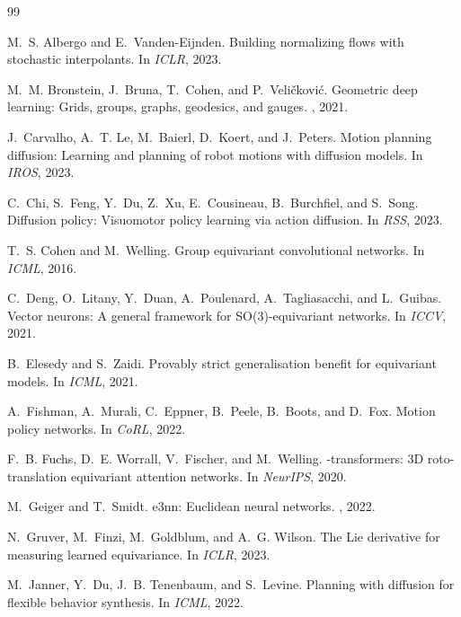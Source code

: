 \documentclass[10pt,twocolumn,letterpaper]{article}
\theoremstyle{plain}
\begin{document}
\small

\begin{thebibliography}{99}

M.~S. Albergo and E.~Vanden-Eijnden.
\newblock Building normalizing flows with stochastic interpolants.
\newblock In {\em ICLR}, 2023.

M.~M. Bronstein, J.~Bruna, T.~Cohen, and P.~Veli\v{c}kovi\'{c}.
\newblock Geometric deep learning: Grids, groups, graphs, geodesics, and gauges.
, 2021.

J.~Carvalho, A.~T. Le, M.~Baierl, D.~Koert, and J.~Peters.
\newblock Motion planning diffusion: Learning and planning of robot motions with
  diffusion models.
\newblock In {\em IROS}, 2023.

C.~Chi, S.~Feng, Y.~Du, Z.~Xu, E.~Cousineau, B.~Burchfiel, and S.~Song.
\newblock Diffusion policy: Visuomotor policy learning via action diffusion.
\newblock In {\em RSS}, 2023.

T.~S. Cohen and M.~Welling.
\newblock Group equivariant convolutional networks.
\newblock In {\em ICML}, 2016.

C.~Deng, O.~Litany, Y.~Duan, A.~Poulenard, A.~Tagliasacchi, and L.~Guibas.
\newblock Vector neurons: A general framework for {SO(3)}-equivariant networks.
\newblock In {\em ICCV}, 2021.

B.~Elesedy and S.~Zaidi.
\newblock Provably strict generalisation benefit for equivariant models.
\newblock In {\em ICML}, 2021.

A.~Fishman, A.~Murali, C.~Eppner, B.~Peele, B.~Boots, and D.~Fox.
\newblock Motion policy networks.
\newblock In {\em CoRL}, 2022.

F.~B. Fuchs, D.~E. Worrall, V.~Fischer, and M.~Welling.
-transformers: 3{D} roto-translation equivariant attention
  networks.
\newblock In {\em NeurIPS}, 2020.

M.~Geiger and T.~Smidt.
\newblock e3nn: Euclidean neural networks.
, 2022.

N.~Gruver, M.~Finzi, M.~Goldblum, and A.~G. Wilson.
\newblock The {L}ie derivative for measuring learned equivariance.
\newblock In {\em ICLR}, 2023.

M.~Janner, Y.~Du, J.~B. Tenenbaum, and S.~Levine.
\newblock Planning with diffusion for flexible behavior synthesis.
\newblock In {\em ICML}, 2022.


\end{thebibliography}
\end{document}
